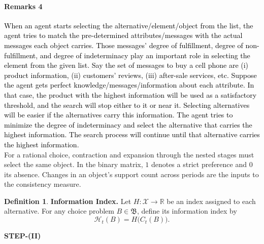 \documentclass[conference]{IEEEtran}
\theoremstyle{plain}
\theoremstyle{definition}
\newtheorem{definition}{Definition}
\theoremstyle{remark}
\begin{document}
	\paragraph{Remarks 4} 
	\textcolor{black}{When an agent starts selecting the alternative/element/object from the list, the agent tries to match the pre-determined attributes/messages with the actual messages each object carries. Those messages' degree of fulfillment, degree of non-fulfillment, and degree of indeterminacy play an important role in selecting the element from the given list. Say the set of messages to buy a cell phone are (i) product information, (ii) customers' reviews, (iii) after-sale services, etc. Suppose the agent gets perfect knowledge/messages/information about each attribute. In that case, the product with the highest information will be used as a satisfactory threshold, and the search will stop either to it or near it. Selecting alternatives will be easier if the alternatives carry this information. The agent tries to minimize the degree of indeterminacy and select the alternative that carries the highest information. The search process will continue until that alternative carries the highest information.}\\
	\indent For a rational choice, contraction and expansion through the nested stages must select the same object. In the binary matrix, $1$ denotes a strict preference and $0$ its absence. Changes in an object’s support count across periods are the inputs to the consistency measure.
	\begin{definition}\textbf{Information Index.}
		Let $H:\mathcal X\to\mathbb{R}$ be an index assigned to each alternative. For any choice problem $B\in\mathfrak B$, define its information index by
		\[
			\mathcal H_t(B)=H\bigl(C_t(B)\bigr).
		\]
	\end{definition}
	\begin{center}
		\textbf{STEP-(II)}
	\end{center}
\end{document}
